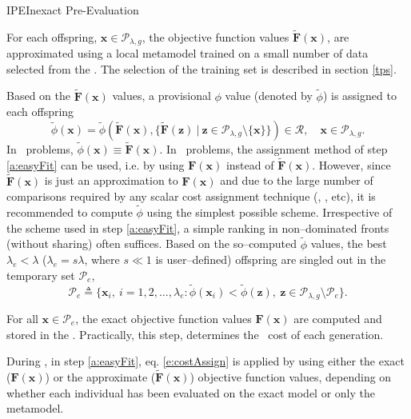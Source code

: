 \documentclass{vki_ls}
\newcommand{\vect}[1]{\bm{#1}}
\newcommand{\set}[1]{\mathcal{#1}}
\newcommand{\apprx}[1]{\tilde{#1}}
\newcommand{\defeq}{\triangleq}
\begin{document}
\begin{namedalgorithm}{IPE}{Inexact Pre-Evaluation}{}
\item[Inexact evaluation]
For each offspring, $\vect{x}\!\in\!\set{P}_{\lambda,g}$, the objective function values $\apprx{\vect{F}}(\vect{x})$, are approximated using a local metamodel trained on a small number of data selected from the \DB. 
The selection of the training set is described in section \ref{tps}. 
%
\item[Screening]\label{a:ipeSelect}
Based on the $\apprx{\vect{F}}(\vect{x})$ values, a provisional
$\phi$ value (denoted by $\apprx{\phi}$) is assigned to each
offspring
%
\begin{equation} \label{e:cost-tmp}
   \apprx{\phi}(\vect{x}) = \apprx{\phi}(\apprx{\vect{F}}(\vect{x}), %
   \{\apprx{\vect{F}}(\vect{z})\ |\ %
   \vect{z} \in\set{P}_{\lambda,g}\setminus\{\vect{x}\}\}) %
   \in \set{R}, \quad \vect{x} \in \set{P}_{\lambda,g}.
\end{equation}
%
In \SOO\ problems, $\apprx{\phi}(\vect{x})\!\equiv\!\apprx{\vect{F}}(\vect{x})$.
In \MOO\ problems, the assignment method of step \ref{a:easyFit} can be used, i.e. by using $\vect{F}(\vect{x})$ instead of $\apprx{\vect{F}}(\vect{x})$.
However, since $\apprx{\vect{F}}(\vect{x})$ is just an approximation to 
$\vect{F}(\vect{x})$ and due to the large number of comparisons required by 
any scalar cost assignment technique (\SPEA, \NSGA, etc),
it is recommended to compute $\apprx{\phi}$ using the simplest possible scheme.
Irrespective of the scheme used in step \ref{a:easyFit}, a simple ranking in
non--dominated fronts (without sharing) often suffices. Based on the
so--computed $\apprx{\phi}$ values, the best $\lambda_e\!<\!\lambda$
($\lambda_e\!=\!s \lambda$, where $s\!\ll\!1$ is user--defined) offspring are singled out in the 
temporary set $\set{P}_{e}$,
%
\begin{equation}
    \set{P}_{e} \defeq \{ \vect{x}_i, \medspace i=1,2,\dots,\lambda_e :
    \apprx{\phi}(\vect{x}_i) < \apprx{\phi}(\vect{z}), 
    \medspace \vect{z} \in \set{P}_{\lambda,g}\setminus\set{P}_{e}\}.
    \nonumber
\end{equation}
%
\item[Exact evaluation]
For all $\vect{x}\!\in\!\set{P}_{e}$, the exact objective function values $\vect{F}(\vect{x})$ are computed and stored in the \DB. 
Practically, this step, determines the \CPU\ cost of each generation.
%
\end{namedalgorithm}
%
\noindent
During \IPE, in step \ref{a:easyFit}, eq. \ref{e:costAssign} is applied by using either the exact ($\vect{F}(\vect{x})$) or the approximate ($\apprx{\vect{F}}(\vect{x})$) objective function values, depending on whether each individual has been evaluated on the exact model or only the metamodel.
\end{document}
